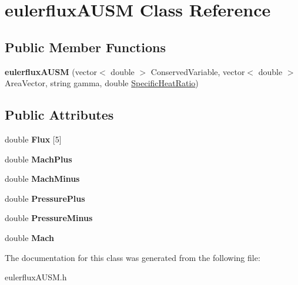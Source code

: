 \hypertarget{classeulerfluxAUSM}{}\section{eulerflux\+A\+U\+SM Class Reference}
\label{classeulerfluxAUSM}
\subsection*{Public Member Functions}
\begin{DoxyCompactItemize}
\item 
{\bfseries eulerflux\+A\+U\+SM} (vector$<$ double $>$ Conserved\+Variable, vector$<$ double $>$ Area\+Vector, string gamma, double \hyperlink{interface_8h_ab683b1fef77e9bd4205b818c943fec96}{Specific\+Heat\+Ratio})\hypertarget{classeulerfluxAUSM_a313596688131132478810bf14c0701ae}{}\label{classeulerfluxAUSM_a313596688131132478810bf14c0701ae}

\end{DoxyCompactItemize}
\subsection*{Public Attributes}
\begin{DoxyCompactItemize}
\item 
double {\bfseries Flux} \mbox{[}5\mbox{]}\hypertarget{classeulerfluxAUSM_a46908ae326123ac416f7ae023c280060}{}\label{classeulerfluxAUSM_a46908ae326123ac416f7ae023c280060}

\item 
double {\bfseries Mach\+Plus}\hypertarget{classeulerfluxAUSM_a9565c076f0be6c66124056ed3fff66b7}{}\label{classeulerfluxAUSM_a9565c076f0be6c66124056ed3fff66b7}

\item 
double {\bfseries Mach\+Minus}\hypertarget{classeulerfluxAUSM_a8a114564c03cd55a32e0255f9bddbd20}{}\label{classeulerfluxAUSM_a8a114564c03cd55a32e0255f9bddbd20}

\item 
double {\bfseries Pressure\+Plus}\hypertarget{classeulerfluxAUSM_abfd3213993dd4b53b12c3f5ecd7046e5}{}\label{classeulerfluxAUSM_abfd3213993dd4b53b12c3f5ecd7046e5}

\item 
double {\bfseries Pressure\+Minus}\hypertarget{classeulerfluxAUSM_a509830d732c5117ce212397b07e60720}{}\label{classeulerfluxAUSM_a509830d732c5117ce212397b07e60720}

\item 
double {\bfseries Mach}\hypertarget{classeulerfluxAUSM_a7c9560ef18e086f6d3cc376c151ad2ff}{}\label{classeulerfluxAUSM_a7c9560ef18e086f6d3cc376c151ad2ff}

\end{DoxyCompactItemize}


The documentation for this class was generated from the following file\+:\begin{DoxyCompactItemize}
\item 
eulerflux\+A\+U\+S\+M.\+h\end{DoxyCompactItemize}
